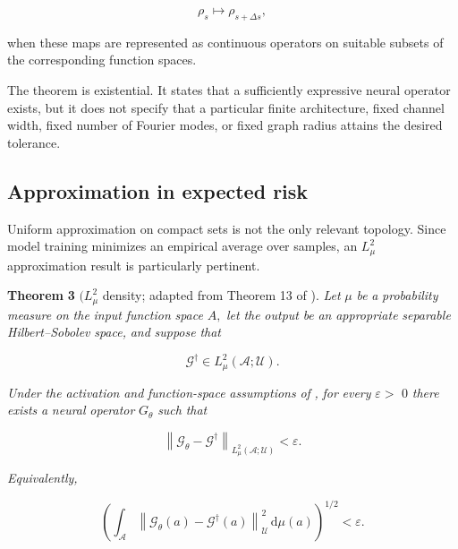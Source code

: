 \begin{equation}
\label{eq:239}
\rho_s\longmapsto\rho_{s+\Delta s},
\end{equation}

when these maps are represented as continuous operators on suitable subsets of the corresponding function spaces.

The theorem is existential. It states that a sufficiently expressive neural operator exists, but it does not specify that a particular finite architecture, fixed channel width, fixed number of Fourier modes, or fixed graph radius attains the desired tolerance.

\subsection{Approximation in expected risk}
\label{sec:auxiliary_theoretical_results_approximation_in_expected_risk}

Uniform approximation on compact sets is not the only relevant topology. Since model training minimizes an empirical average over samples, an \(L_{\mu}^{2}\) approximation result is particularly pertinent.

\textbf{Theorem} \textbf{3} \(( L_{\mu}^{2}\) density; adapted from Theorem 13 of \cite{kovachki2023operators}). \emph{Let} \(\mu\) \emph{be} \emph{a} \emph{probability} \emph{measure} \emph{on} \emph{the} \emph{input} \emph{function} \emph{space} \(A ,\) \emph{let} \emph{the} \emph{output} \emph{be} \emph{an} \emph{appropriate} \emph{separable} \emph{Hilbert–Sobolev} \emph{space,} \emph{and} \emph{suppose} \emph{that}

\begin{equation}
\label{eq:240}
\mathcal G^{\dagger}\in L_{\mu}^{2}(\mathcal A;\mathcal U).
\end{equation}

\emph{Under} \emph{the} \emph{activation} \emph{and} \emph{function-space} \emph{assumptions} \emph{of} \emph{\cite{kovachki2023operators},} \emph{for} \emph{every} \(\varepsilon >\) 0 \emph{there} \emph{exists} \emph{a} \emph{neural} \emph{operator} \(G_{\theta}\) \emph{such} \emph{that}

\begin{equation}
\label{eq:241}
\left\|\mathcal G_{\theta}-\mathcal G^{\dagger}\right\|_{L_{\mu}^{2}(\mathcal A;\mathcal U)}<\varepsilon.
\end{equation}

\emph{Equivalently,}

\begin{equation}
\label{eq:242}
\left(\int_{\mathcal A}\left\|\mathcal G_{\theta}(a)-\mathcal G^{\dagger}(a)\right\|_{\mathcal U}^{2}\,\mathrm d\mu(a)\right)^{1/2}<\varepsilon.
\end{equation}

